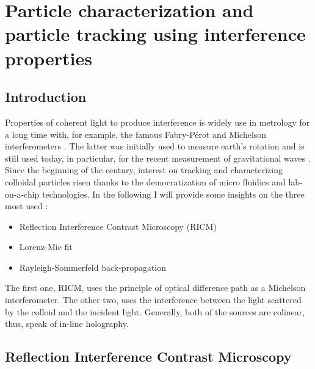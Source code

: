 \newpage
\section{Particle characterization and particle tracking using interference properties}
		\label{sec:chapter2}

\subsection{Introduction}

Properties of coherent light to produce interference is widely use in metrology for a long time with, for example, the famous Fabry-Pérot  \cite{fabry_theorie_1899, perot_application_1899} and Michelson interferometers \cite{michelson_relative_1887}. The latter was initially used to measure earth's rotation and is still used today, in particular, for the recent measurement of gravitational waves
\cite{ligo_scientific_collaboration_and_virgo_collaboration_gw151226_2016}. 
Since the beginning of the century, interest on tracking and characterizing colloidal particles risen thanks to the democratization of micro fluidics and lab-on-a-chip technologies. In the following I will provide some insights on the three most used :

\begin{itemize}
	\item Reflection Interference Contrast Microscopy (\gls{RICM})
	\item Lorenz-Mie fit
	\item Rayleigh-Sommerfeld back-propagation
\end{itemize}

The first one, \gls{RICM}, uses the principle of optical difference path as a Michelson interferometer. The other two, uses the interference between the light scattered by the colloid and the incident light. Generally, both of the sources  are colinear, thus, speak of in-line holography. 



\subsection{Reflection Interference Contrast Microscopy}

